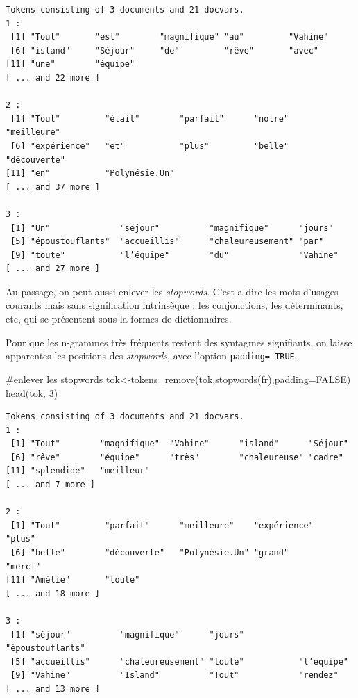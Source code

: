 \documentclass[
  letterpaper,
  DIV=11,
  numbers=noendperiod]{scrreprt}
\newenvironment{Shaded}{\begin{snugshade}}{\end{snugshade}}
\newcommand{\AttributeTok}[1]{\textcolor[rgb]{0.40,0.45,0.13}{#1}}
\newcommand{\CommentTok}[1]{\textcolor[rgb]{0.37,0.37,0.37}{#1}}
\newcommand{\ConstantTok}[1]{\textcolor[rgb]{0.56,0.35,0.01}{#1}}
\newcommand{\DecValTok}[1]{\textcolor[rgb]{0.68,0.00,0.00}{#1}}
\newcommand{\FunctionTok}[1]{\textcolor[rgb]{0.28,0.35,0.67}{#1}}
\newcommand{\NormalTok}[1]{\textcolor[rgb]{0.00,0.23,0.31}{#1}}
\newcommand{\OtherTok}[1]{\textcolor[rgb]{0.00,0.23,0.31}{#1}}
\newcommand{\StringTok}[1]{\textcolor[rgb]{0.13,0.47,0.30}{#1}}
\begin{document}
\begin{verbatim}
Tokens consisting of 3 documents and 21 docvars.
1 :
 [1] "Tout"       "est"        "magnifique" "au"         "Vahine"    
 [6] "island"     "Séjour"     "de"         "rêve"       "avec"      
[11] "une"        "équipe"    
[ ... and 22 more ]

2 :
 [1] "Tout"         "était"        "parfait"      "notre"        "meilleure"   
 [6] "expérience"   "et"           "plus"         "belle"        "découverte"  
[11] "en"           "Polynésie.Un"
[ ... and 37 more ]

3 :
 [1] "Un"              "séjour"          "magnifique"      "jours"          
 [5] "époustouflants"  "accueillis"      "chaleureusement" "par"            
 [9] "toute"           "l’équipe"        "du"              "Vahine"         
[ ... and 27 more ]
\end{verbatim}

Au passage, on peut aussi enlever les \emph{stopwords}. C'est a dire les
mots d'usages courants mais sans signification intrinsèque : les
conjonctions, les déterminants, etc, qui se présentent sous la formes de
dictionnaires.

Pour que les n-grammes très fréquents restent des syntagmes signifiants,
on laisse apparentes les positions des \emph{stopwords}, avec l'option
\texttt{padding=\ TRUE}.

\begin{Shaded}
\begin{Highlighting}[]
\CommentTok{\#enlever les stopwords}
\NormalTok{tok}\OtherTok{\textless{}{-}}\FunctionTok{tokens\_remove}\NormalTok{(tok,}\FunctionTok{stopwords}\NormalTok{(}\StringTok{\textquotesingle{}fr\textquotesingle{}}\NormalTok{),}\AttributeTok{padding=}\ConstantTok{FALSE}\NormalTok{)}
\FunctionTok{head}\NormalTok{(tok, }\DecValTok{3}\NormalTok{)}
\end{Highlighting}
\end{Shaded}

\begin{verbatim}
Tokens consisting of 3 documents and 21 docvars.
1 :
 [1] "Tout"        "magnifique"  "Vahine"      "island"      "Séjour"     
 [6] "rêve"        "équipe"      "très"        "chaleureuse" "cadre"      
[11] "splendide"   "meilleur"   
[ ... and 7 more ]

2 :
 [1] "Tout"         "parfait"      "meilleure"    "expérience"   "plus"        
 [6] "belle"        "découverte"   "Polynésie.Un" "grand"        "merci"       
[11] "Amélie"       "toute"       
[ ... and 18 more ]

3 :
 [1] "séjour"          "magnifique"      "jours"           "époustouflants" 
 [5] "accueillis"      "chaleureusement" "toute"           "l’équipe"       
 [9] "Vahine"          "Island"          "Tout"            "rendez"         
[ ... and 13 more ]
\end{verbatim}
\end{document}
